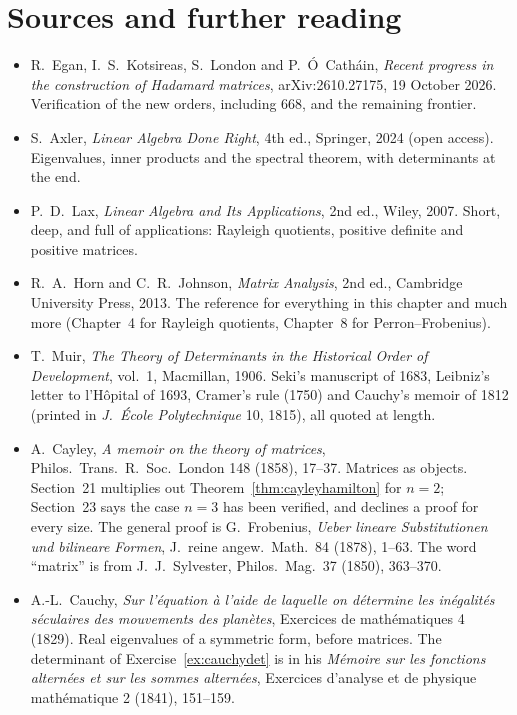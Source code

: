 \section*{Sources and further reading}

\begin{itemize}\raggedright
\item R.~Egan, I.~S.~Kotsireas, S.~London and P.~\'O~Cath\'ain, \emph{Recent progress in the construction of Hadamard matrices}, arXiv:2610.27175, 19 October 2026. Verification of the new orders, including $668$, and the remaining frontier.
\item S.~Axler, \emph{Linear Algebra Done Right}, 4th ed., Springer, 2024 (open access). Eigenvalues, inner products and the spectral theorem, with determinants at the end.
\item P.~D.~Lax, \emph{Linear Algebra and Its Applications}, 2nd ed., Wiley, 2007. Short, deep, and full of applications: Rayleigh quotients, positive definite and positive matrices.
\item R.~A.~Horn and C.~R.~Johnson, \emph{Matrix Analysis}, 2nd ed., Cambridge University Press, 2013. The reference for everything in this chapter and much more (Chapter~4 for Rayleigh quotients, Chapter~8 for Perron--Frobenius).
\item T.~Muir, \emph{The Theory of Determinants in the Historical Order of Development}, vol.~1, Macmillan, 1906. Seki's manuscript of 1683, Leibniz's letter to l'H\^opital of 1693, Cramer's rule (1750) and Cauchy's memoir of 1812 (printed in \emph{J.\ \'Ecole Polytechnique} 10, 1815), all quoted at length.
\item A.~Cayley, \emph{A memoir on the theory of matrices}, Philos.\ Trans.\ R.\ Soc.\ London 148 (1858), 17--37. Matrices as objects. Section~21 multiplies out Theorem~\ref{thm:cayleyhamilton} for $n=2$; Section~23 says the case $n=3$ has been verified, and declines a proof for every size. The general proof is G.~Frobenius, \emph{Ueber lineare Substitutionen und bilineare Formen}, J.\ reine angew.\ Math.\ 84 (1878), 1--63. The word ``matrix'' is from J.~J.~Sylvester, Philos.\ Mag.\ 37 (1850), 363--370.
\item A.-L.~Cauchy, \emph{Sur l'\'equation \`a l'aide de laquelle on d\'etermine les in\'egalit\'es s\'eculaires des mouvements des plan\`etes}, Exercices de math\'ematiques 4 (1829). Real eigenvalues of a symmetric form, before matrices. The determinant of Exercise~\ref{ex:cauchydet} is in his \emph{M\'emoire sur les fonctions altern\'ees et sur les sommes altern\'ees}, Exercices d'analyse et de physique math\'ematique 2 (1841), 151--159.

\end{itemize}
